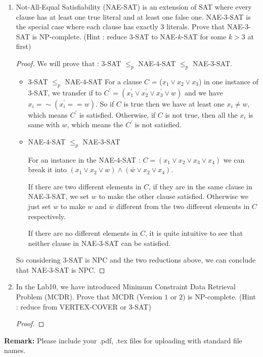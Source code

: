 \documentclass[12pt,a4paper]{article}
\theoremstyle{definition}
\begin{document}
\begin{enumerate}
	\item Not-All-Equal Satisfiability (NAE-SAT) is an extension of SAT where every clause has at least one true literal and at least one false one. NAE-$3$-SAT is the special case where each clause has exactly $3$ literals. Prove that NAE-$3$-SAT is NP-complete. (Hint : reduce $3$-SAT to NAE-$k$-SAT for some $k > 3$ at first)
	\begin{proof}
   
	 We will prove that : $3$-SAT $\leq_{p}$ NAE-$4$-SAT $\leq_{p}$ NAE-$3$-SAT.
	 
	 \begin{itemize}
		 \item $3$-SAT $\leq_{p}$ NAE-$4$-SAT
		  For a clause $C$ = ($x_1 \lor  x_2 \lor x_3$) in one instance of $3$-SAT, we transfer if to $C^{'}=(x^{'}_1 \lor  x^{'}_2 \lor  x^{'}_3 \lor w)$ and we have 
		  $x_i = \sim (x^{'}_i == w)$. So if  $C$ is true then we have at least one $x_i \neq w$, which means $C^{'}$ is satisfied. Otherwise, if $C$ is not true, then all the 
		  $x_i$ is same with $w$, which means the $C^{'}$ is not satisfied.

		 \item NAE-$4$-SAT $\leq_{p}$ NAE-$3$-SAT
		 
		 For an instance in the NAE-$4$-SAT : $C = (x_1 \lor  x_2 \lor x_3 \lor x_4)$ we can break it into $(x_1 \lor x_2 \lor w) \land (\bar{w} \lor x_2 \lor x_4)$.

		 If there are two different elements in $C$, if they are in the same clause in NAE-$3$-SAT, we set $w$ to make the other clause satisfied. Otherwise we just set $w$ to make $w$ and $\bar{w}$ different from 
	 the two different elements in $C$ respectively.

	 If there are no different elements in $C$, it is quite intuitive to see that neither clause in NAE-$3$-SAT can be satisfied.
		\end{itemize}

		So considering $3$-SAT is NPC and the two reductions above, we can conclude that NAE-$3$-SAT is NPC.


    \end{proof}

	\item In the Lab10, we have introduced Minimum Constraint Data Retrieval Problem (MCDR). Prove that MCDR (Version $1$ or $2$) is NP-complete. (Hint : reduce from VERTEX-COVER or $3$-SAT)
	
	\begin{proof}
   
 \end{proof}

\end{enumerate}

\textbf{Remark:} Please include your .pdf, .tex files for uploading with standard file names.




\end{document}
